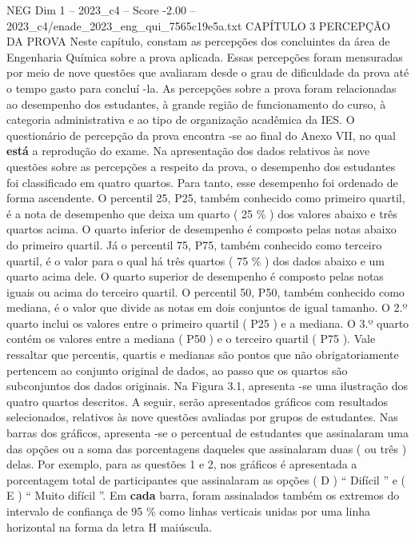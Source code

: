 \begin{textsample}{NEG Dim 1 – 2023\_c4 – Score -2.00 – 2023\_c4/enade\_2023\_eng\_qui\_7565c19e5a.txt}  \label{ex:f1_neg_246}
CAPÍTULO 3 PERCEPÇÃO DA PROVA Neste capítulo, constam as percepções dos concluintes da área de Engenharia Química sobre a prova aplicada.
Essas percepções foram mensuradas por meio de nove questões que avaliaram desde o grau de dificuldade da prova até o tempo gasto para concluí -la.
As percepções sobre a prova foram relacionadas ao desempenho dos estudantes, à grande região de funcionamento do curso, à categoria administrativa e ao tipo de organização acadêmica da IES.
O questionário de percepção da prova encontra -se ao final do Anexo VII, no qual \textbf{está} a reprodução do exame.
Na apresentação dos dados relativos às nove questões sobre as percepções a respeito da prova, o desempenho dos estudantes foi classificado em quatro quartos.
Para tanto, esse desempenho foi ordenado de forma ascendente.
O percentil 25, P25, também conhecido como primeiro quartil, é a nota de desempenho que deixa um quarto ( 25 \% ) dos valores abaixo e três quartos acima.
O quarto inferior de desempenho é composto pelas notas abaixo do primeiro quartil.
Já o percentil 75, P75, também conhecido como terceiro quartil, é o valor para o qual há três quartos ( 75 \% ) dos dados abaixo e um quarto acima dele.
O quarto superior de desempenho é composto pelas notas iguais ou acima do terceiro quartil.
O percentil 50, P50, também conhecido como mediana, é o valor que divide as notas em dois conjuntos de igual tamanho.
O 2.º quarto inclui os valores entre o primeiro quartil ( P25 ) e a mediana.
O 3.º quarto contém os valores entre a mediana ( P50 ) e o terceiro quartil ( P75 ).
Vale ressaltar que percentis, quartis e medianas são pontos que não obrigatoriamente pertencem ao conjunto original de dados, ao passo que os quartos são subconjuntos dos dados originais.
Na Figura 3.1, apresenta -se uma ilustração dos quatro quartos descritos.
A seguir, serão apresentados gráficos com resultados selecionados, relativos às nove questões avaliadas por grupos de estudantes.
Nas barras dos gráficos, apresenta -se o percentual de estudantes que assinalaram uma das opções ou a soma das porcentagens daqueles que assinalaram duas ( ou três ) delas.
Por exemplo, para as questões 1 e 2, nos gráficos é apresentada a porcentagem total de participantes que assinalaram as opções ( D ) “ Difícil ” e ( E ) “ Muito difícil ”.
Em \textbf{cada} barra, foram assinalados também os extremos do intervalo de confiança de 95 \% como linhas verticais unidas por uma linha horizontal na forma da letra H maiúscula.

\end{textsample}
